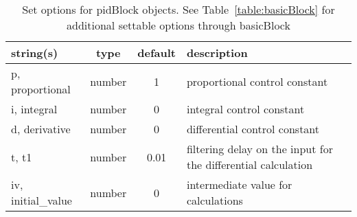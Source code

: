 \begin{table}[ht]
\centering
\begin{tabular}{p{5cm} c c p{7cm}}
\hline
string(s) & type & default & description \\
\hline
p, proportional & number & 1 & proportional control constant\\
i, integral & number & 0 & integral control constant\\
d, derivative & number & 0 & differential control constant\\
t, t1 & number & 0.01 & filtering delay on the input for the differential calculation\\
iv, initial\_value & number & 0 & intermediate value for calculations\\
\hline
\end{tabular}
\caption{Set options for pidBlock objects. See Table~\ref{table:basicBlock} for additional settable options through basicBlock}
\label{table:pidBlock}
\end{table}

